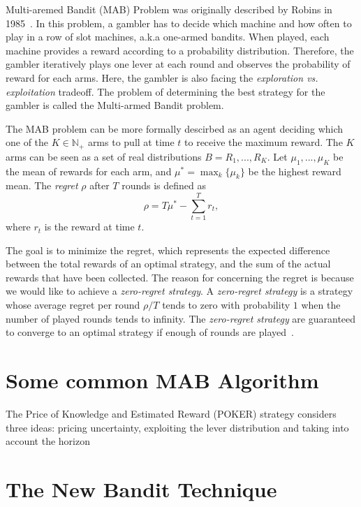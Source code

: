 Multi-aremed Bandit (MAB) Problem was originally described by Robins in 1985~\cite{Robbins:1985:MAB}.
In this problem, a gambler has to decide which machine and how often to play in a row of slot machines, a.k.a one-armed bandits. 
When played, each machine provides a reward according to a probability distribution.
Therefore, the gambler iteratively plays one lever at each round and observes the probability of reward for each arms.
Here, the gambler is also facing the \textit{exploration vs. exploitation} tradeoff.
The problem of determining the best strategy for the gambler is called the Multi-armed Bandit problem.


The MAB problem can be more formally descirbed as 
an agent deciding which one of the $K \in \mathbb{N}_+$ arms to pull at time $t$ to receive the maximum reward.
The $K$ arms can be seen as a set of real distributions $B = {R_1, ..., R_K}$.
Let $\mu_1, ..., \mu_K$ be the mean of rewards for each arm, and $\mu^* = \max_{k} \{ \mu_k \}$ be the highest reward mean.
The \textit{regret} $\rho$ after $T$ rounds is defined as
\begin{displaymath}
\rho = T\mu^* - \sum_{t=1}^{T} r_t,
\end{displaymath}
where $r_t$ is the reward at time $t$.

The goal is to minimize the regret, which represents the expected difference between the total rewards of an optimal strategy,
and the sum of the actual rewards that have been collected.  
The reason for concerning the regret is because we would like to achieve a \textit{zero-regret strategy}.
A \textit{zero-regret strategy} is a strategy whose average regret per round $\rho / T$ tends to zero with probability $1$ 
when the number of played rounds tends to infinity.
The \textit{zero-regret strategy} are guaranteed to converge to an optimal strategy if enough of rounds are played~\cite{Vermorel:2005:MAB}.



\section{Some common MAB Algorithm}


The Price of Knowledge and Estimated Reward (POKER) strategy considers three ideas: pricing uncertainty, exploiting the lever distribution and taking into account the horizon


\section{The New Bandit Technique}



